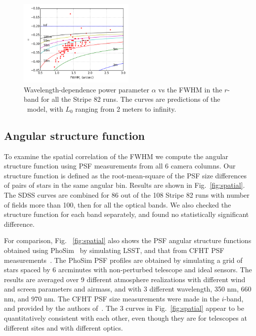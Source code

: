 \begin{figure}
\centering
\includegraphics[width=0.5\textwidth]{FIGURES/alpha_fwhm.png}
\caption{Wavelength-dependence power parameter $\alpha$ vs the
  FWHM in the $r$-band for all the Stripe 82 runs. 
The curves are predictions of the \vk~model, 
with $L_0$ ranging from 2 meters to infinity.
\label{fig:alpha_fwhm}}
\end{figure}



\subsection{Angular structure function} 

To examine the spatial correlation of the FWHM we compute the angular
structure function using PSF measurements from all 6 camera columns.
Our structure function is defined as
the root-mean-square of the PSF size differences of pairs of stars
in the same angular bin. 
Results are shown in Fig.~\ref{fig:spatial}.
The SDSS curves are combined for 86 out of the 108 Stripe 82 runs with number of
fields more than 100, then for all
the optical bands. We also checked the structure function for each band
separately, and found no statistically significant difference.

For comparison, Fig. ~\ref{fig:spatial} also shows the PSF angular
structure functions obtained using PhoSim~\citep{phosim} by simulating LSST,
and that from CFHT PSF measurements~\citep{heymans2012}.
The PhoSim PSF profiles are obtained by simulating a grid of stars
spaced by 6 arcminutes with non-perturbed telescope and ideal sensors.
The results are averaged over 9 different atmosphere realizations with
different wind and screen parameters and airmass, and with 3 different
wavelength, 350 nm, 660 nm, and 970 nm.
The CFHT PSF size measurements were made in the $i$-band, and provided
by the authors of~\cite{heymans2012}.
The 3 curves in Fig.~\ref{fig:spatial} appear to be quantitatively
consistent with each other, even though they are for telescopes at
different sites and with different optics.


